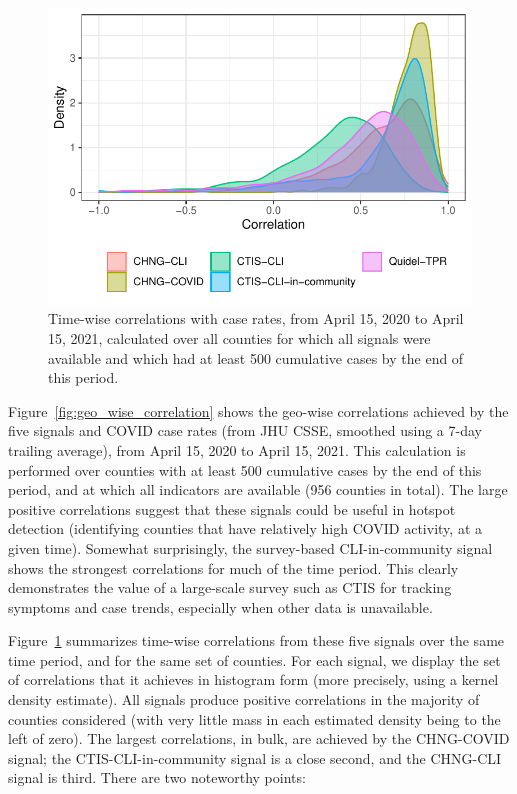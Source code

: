 \documentclass[9pt,twocolumn,twoside,lineno]{pnas-new}
\begin{document}
\begin{figure}[t]
  \includegraphics[width=\columnwidth]{fig/time_wise_correlation.pdf}
  \caption{Time-wise correlations with case rates, from April 15, 2020 to April
    15, 2021, calculated over all counties for which all signals were available
    and which had at least 500 cumulative cases by the end of this period.}
  \label{fig:time_wise_correlation}
\end{figure} 

Figure~\ref{fig:geo_wise_correlation} shows the geo-wise correlations achieved
by the five signals and COVID case rates (from JHU CSSE, smoothed using a 7-day
trailing average), from April 15, 2020 to April 15, 2021. This calculation is
performed over counties with at least 500 cumulative cases by the end of this
period, and at which all indicators are available (956 counties in total). The
large positive correlations suggest that these signals could be useful in
hotspot detection (identifying counties that have relatively high COVID
activity, at a given time). Somewhat surprisingly, the survey-based
CLI-in-community signal shows the strongest correlations for much of the time
period. This clearly demonstrates the value of a large-scale survey such as CTIS
for tracking symptoms and case trends, especially when other data is unavailable.

Figure~\ref{fig:time_wise_correlation} summarizes time-wise correlations from
these five signals over the same time period, and for the same set of counties.
For each signal, we display the set of correlations that it achieves in
histogram form (more precisely, using a kernel density estimate). All signals
produce positive correlations in the majority of counties considered (with very
little mass in each estimated density being to the left of zero). The largest
correlations, in bulk, are achieved by the CHNG-COVID signal; the
CTIS-CLI-in-community signal is a close second, and the CHNG-CLI signal is
third. There are two noteworthy points:
\end{document}
